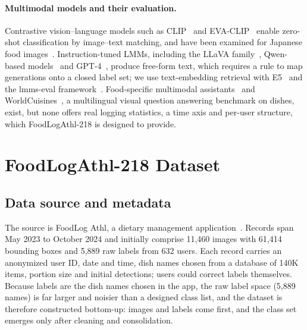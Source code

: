 \documentclass[sigconf, nonacm]{acmart}
\begin{document}
\paragraph{Multimodal models and their evaluation.} Contrastive vision--language models such as CLIP~\cite{CLIP} and EVA-CLIP~\cite{sun2023eva} enable zero-shot classification by image--text matching, and have been examined for Japanese food images~\cite{imajuku2023}. Instruction-tuned LMMs, including the LLaVA family~\cite{liu2024visual,liu2024improved}, Qwen-based models~\cite{bai2023qwen} and GPT-4~\cite{achiam2023gpt}, produce free-form text, which requires a rule to map generations onto a closed label set; we use text-embedding retrieval with E5~\cite{wang2023e5} and the lmms-eval framework~\cite{lmms_eval2024}. Food-specific multimodal assistants~\cite{yin2023foodlmm,Imajuku2025FoodMLLM} and WorldCuisines~\cite{winata2024worldcuisines}, a multilingual visual question answering benchmark on dishes, exist, but none offers real logging statistics, a time axis and per-user structure, which FoodLogAthl-218 is designed to provide.

\section{FoodLogAthl-218 Dataset}
\label{sec:dataset}


\subsection{Data source and metadata}
The source is FoodLog Athl, a dietary management application~\cite{nakamoto2022foodlog}. Records span May 2023 to October 2024 and initially comprise 11,460 images with 61,414 bounding boxes and 5,889 raw labels from 632 users. Each record carries an anonymized user ID, date and time, dish names chosen from a database of 140K items, portion size and initial detections; users could correct labels themselves. Because labels are the dish names chosen in the app, the raw label space (5,889 names) is far larger and noisier than a designed class list, and the dataset is therefore constructed bottom-up: images and labels come first, and the class set emerges only after cleaning and consolidation.
\end{document}
